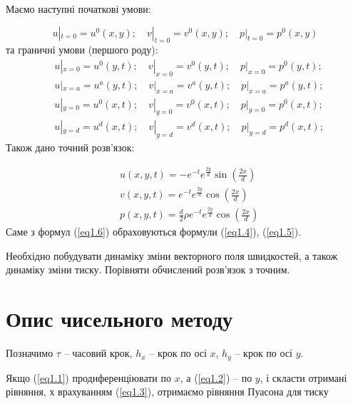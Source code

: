 \documentclass[a4paper,12pt]{article}
\begin{document}
Маємо наступні початкові умови:

\begin{equation} \label{eq1.4}
	u|_{t =0} = u^0(x,y); \quad v|_{t = 0} =v^0(x,y); \quad p|_{t=0} =p^0(x,y)
\end{equation}
та граничні умови (першого роду):
\begin{equation}\label{eq1.5}
	\begin{aligned}
		&u|_{x = 0} = u^0 (y,t); \quad v|_{x=0} = v^0(y,t); \quad p|_{x = 0} = p^0(y,t);\\
		&u|_{x = a} = u^a(y,t); \quad v|_{x=a} = v^a(y,t); \quad p|_{x = a} = p^a(y,t);\\
		&u|_{y = 0} = u^0 (x,t); \quad v|_{y=0} = v^0(x,t); \quad p|_{y = 0} = p^0(x,t);\\
		&u|_{y = d} = u^d (x,t); \quad v|_{y=d} = v^d(x,t); \quad p|_{y = d} = p^d(x,t);
	\end{aligned}
\end{equation}
Також дано точний розв'язок:

\begin{equation} \label{eq1.6}
	\begin{aligned}
		&u(x,y,t) = - e^{-t} e^{\frac{2y}{d}} \sin \left( \frac{2x}{d} \right)\\
		&v(x,y,t) = e^{-t} e^{\frac{2y}{d}} \cos \left( \frac{2x}{d} \right) \\
		&p(x,y,t) = \frac{d}{2} \rho e^{-t} e^{\frac{2y}{d}} \cos \left( \frac{2x}{d} \right)
	\end{aligned}
\end{equation}
Саме з формул (\ref{eq1.6}) обраховуються формули (\ref{eq1.4}), (\ref{eq1.5}).

Необхідно побудувати динаміку зміни векторного поля швидкостей, а також динаміку зміни тиску. Порівняти обчислений розв'язок з точним.

\section{Опис чисельного методу}
Позначимо $\tau$ -- часовий крок, $h_x$ -- крок по осі $x$, $h_y$ -- крок по осі $y$.

Якщо (\ref{eq1.1}) продиференціювати по $x$, а (\ref{eq1.2}) -- по $y$, і скласти отримані рівняння, х врахуванням (\ref{eq1.3}), отримаємо рівняння Пуасона для тиску
\end{document}
